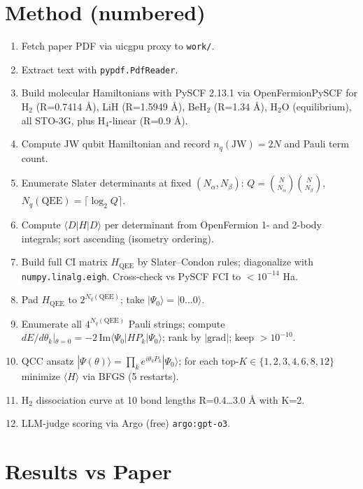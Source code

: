 \documentclass[11pt]{article}
\begin{document}
\section{Method (numbered)}
\begin{enumerate}\itemsep0.1em
\item Fetch paper PDF via uicgpu proxy to \texttt{work/}.
\item Extract text with \texttt{pypdf.PdfReader}.
\item Build molecular Hamiltonians with PySCF 2.13.1 via OpenFermionPySCF for H$_2$ (R=0.7414 \AA), LiH (R=1.5949 \AA), BeH$_2$ (R=1.34 \AA), H$_2$O (equilibrium), all STO-3G, plus H$_4$-linear (R=0.9 \AA).
\item Compute JW qubit Hamiltonian and record $n_q(\text{JW})=2N$ and Pauli term count.
\item Enumerate Slater determinants at fixed $(N_\alpha, N_\beta)$: $Q = \binom{N}{N_\alpha}\binom{N}{N_\beta}$, $N_q(\text{QEE}) = \lceil\log_2 Q\rceil$.
\item Compute $\langle D|H|D\rangle$ per determinant from OpenFermion 1- and 2-body integrals; sort ascending (isometry ordering).
\item Build full CI matrix $H_{\text{QEE}}$ by Slater--Condon rules; diagonalize with \texttt{numpy.linalg.eigh}. Cross-check vs PySCF FCI to $<10^{-14}$ Ha.
\item Pad $H_{\text{QEE}}$ to $2^{N_q(\text{QEE})}$; take $|\Psi_0\rangle=|0\ldots0\rangle$.
\item Enumerate all $4^{N_q(\text{QEE})}$ Pauli strings; compute $dE/d\theta_k|_{\theta=0} = -2\,\text{Im}\langle\Psi_0|H P_k|\Psi_0\rangle$; rank by $|\text{grad}|$; keep $>10^{-10}$.
\item QCC ansatz $|\Psi(\theta)\rangle = \prod_k e^{i\theta_k P_k}|\Psi_0\rangle$; for each top-$K \in \{1,2,3,4,6,8,12\}$ minimize $\langle H\rangle$ via BFGS (5 restarts).
\item H$_2$ dissociation curve at 10 bond lengths R=0.4\ldots3.0 \AA{} with K=2.
\item LLM-judge scoring via Argo (free) \texttt{argo:gpt-o3}.
\end{enumerate}

\section{Results vs Paper}
\end{document}
